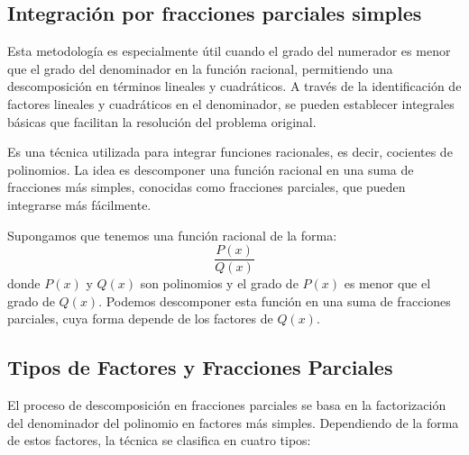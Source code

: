 \newpage
\subsection{Integración por fracciones parciales simples}
Esta metodología es especialmente útil cuando el grado del numerador es menor que el grado del denominador en la función racional, permitiendo una descomposición en términos lineales y cuadráticos. A través de la identificación de factores lineales y cuadráticos en el denominador, se pueden establecer integrales básicas que facilitan la resolución del problema original.
\begin{definition}
    Es una técnica utilizada para integrar funciones racionales, es decir, cocientes de polinomios. La idea es descomponer una función racional en una suma de fracciones más simples, conocidas como fracciones parciales, que pueden integrarse más fácilmente.
\end{definition}
Supongamos que tenemos una función racional de la forma:
\[
\frac{P(x)}{Q(x)}
\]
donde \( P(x) \) y \( Q(x) \) son polinomios y el grado de \( P(x) \) es menor que el grado de \( Q(x) \). Podemos descomponer esta función en una suma de fracciones parciales, cuya forma depende de los factores de \( Q(x) \).

\subsection{Tipos de Factores y Fracciones Parciales}

El proceso de descomposición en fracciones parciales se basa en la factorización del denominador del polinomio en factores más simples. Dependiendo de la forma de estos factores, la técnica se clasifica en cuatro tipos:

